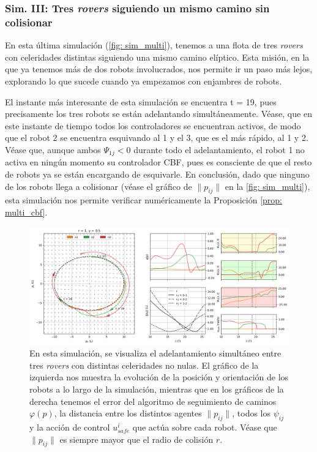 \subsubsection*{Sim. III: Tres \textit{rovers} siguiendo un mismo camino sin colisionar}

En esta última simulación (\autoref{fig: sim_multi}), tenemos a una flota de tres \textit{rovers} con celeridades distintas siguiendo una mismo camino elíptico. Esta misión, en la que ya tenemos más de dos robots involucrados, nos permite ir un paso más lejos, explorando lo que sucede cuando ya empezamos con enjambres de robots.

El instante más interesante de esta simulación se encuentra t = 19, pues precisamente los tres robots se están adelantando simultáneamente. Véase, que en este instante de tiempo todos los controladores se encuentran activos, de modo que el robot 2 se encuentra esquivando al 1 y el 3, que es el más rápido, al 1 y 2. Véase que, aunque ambos $\Psi_{1j} < 0$ durante todo el adelantamiento, el robot 1 no activa en ningún momento su controlador CBF, pues es consciente de que el resto de robots ya se están encargando de esquivarle. En conclusión, dado que ninguno de los robots llega a colisionar (véase el gráfico de $\|p_{ij}\|$ en la \autoref{fig: sim_multi}), esta simulación nos permite verificar numéricamente la Proposición \ref{prop: multi_cbf}.

\newpage
\begin{figure}[h!]
    \centering
    \includegraphics[trim={0 0cm 0 -1cm}, clip, width=1\textwidth]{fig/sim_multi.png}
    \caption{En esta simulación, se visualiza el adelantamiento simultáneo entre tres \textit{rovers} con distintas celeridades no nulas. El gráfico de la izquierda nos muestra la evolución de la posición y orientación de los robots a lo largo de la simulación, mientras que en los gráficos de la derecha tenemos el error del algoritmo de seguimiento de caminos $\varphi(p)$, la distancia entre los distintos agentes $\|p_{ij}\|$, todos los $\psi_{ij}$ y la acción de control $u_{safe}^i$ que actúa sobre cada robot. Véase que $\|p_{ij}\|$ es siempre mayor que el radio de colisión $r$.}
    \label{fig: sim_multi}
\end{figure}



